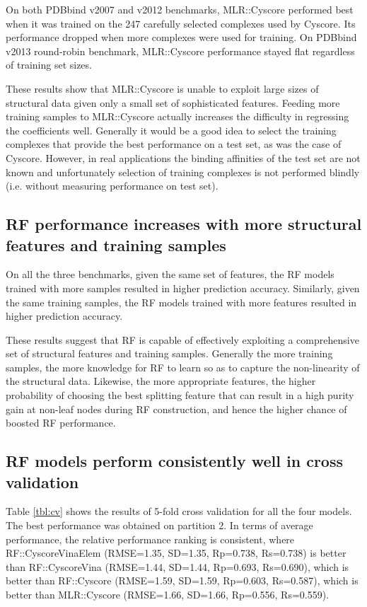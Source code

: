 \documentclass[linenumbers]{bmcart}
\begin{document}
On both PDBbind v2007 and v2012 benchmarks, MLR::Cyscore performed best when it was trained on the 247 carefully selected complexes used by Cyscore. Its performance dropped when more complexes were used for training. On PDBbind v2013 round-robin benchmark, MLR::Cyscore performance stayed flat regardless of training set sizes.

These results show that MLR::Cyscore is unable to exploit large sizes of structural data given only a small set of sophisticated features. Feeding more training samples to MLR::Cyscore actually increases the difficulty in regressing the coefficients well. Generally it would be a good idea to select the training complexes that provide the best performance on a test set, as was the case of Cyscore. However, in real applications the binding affinities of the test set are not known and unfortunately selection of training complexes is not performed blindly (i.e. without measuring performance on test set).

\subsection*{RF performance increases with more structural features and training samples}

On all the three benchmarks, given the same set of features, the RF models trained with more samples resulted in higher prediction accuracy. Similarly, given the same training samples, the RF models trained with more features resulted in higher prediction accuracy.

These results suggest that RF is capable of effectively exploiting a comprehensive set of structural features and training samples. Generally the more training samples, the more knowledge for RF to learn so as to capture the non-linearity of the structural data. Likewise, the more appropriate features, the higher probability of choosing the best splitting feature that can result in a high purity gain at non-leaf nodes during RF construction, and hence the higher chance of boosted RF performance.

\subsection*{RF models perform consistently well in cross validation}

Table \ref{tbl:cv} shows the results of 5-fold cross validation for all the four models. The best performance was obtained on partition 2. In terms of average performance, the relative performance ranking is consistent, where RF::CyscoreVinaElem (RMSE=1.35, SD=1.35, Rp=0.738, Rs=0.738) is better than RF::CyscoreVina (RMSE=1.44, SD=1.44, Rp=0.693, Rs=0.690), which is better than RF::Cyscore (RMSE=1.59, SD=1.59, Rp=0.603, Rs=0.587), which is better than MLR::Cyscore (RMSE=1.66, SD=1.66, Rp=0.556, Rs=0.559).
\end{document}
